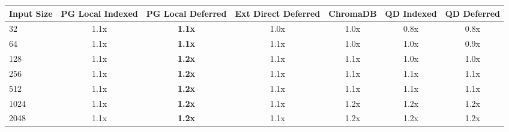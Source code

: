 \begin{tabular}{lcccccc}
\toprule
\textbf{Input Size} & \textbf{PG Local Indexed} & \textbf{PG Local Deferred} & \textbf{Ext Direct Deferred} & \textbf{ChromaDB} & \textbf{QD Indexed} & \textbf{QD Deferred} \\
\midrule
32 & 1.1x & \textbf{1.1x} & 1.0x & 1.0x & 0.8x & 0.8x \\
64 & 1.1x & \textbf{1.1x} & 1.1x & 1.0x & 1.0x & 0.9x \\
128 & 1.1x & \textbf{1.2x} & 1.1x & 1.1x & 1.0x & 1.0x \\
256 & 1.1x & \textbf{1.2x} & 1.1x & 1.1x & 1.1x & 1.1x \\
512 & 1.1x & \textbf{1.2x} & 1.1x & 1.1x & 1.1x & 1.1x \\
1024 & 1.1x & \textbf{1.2x} & 1.1x & 1.2x & 1.2x & 1.2x \\
2048 & 1.1x & \textbf{1.2x} & 1.1x & 1.2x & 1.2x & 1.2x \\
\bottomrule
\end{tabular}

